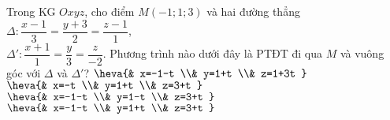 \begin{ex}%
Trong KG $Oxyz$, cho điểm $M(-1;1;3)$ và hai đường thẳng $\Delta \colon \dfrac{x-1}{3}=\dfrac{y+3}{2}=\dfrac{z-1}{1}$, \\
$\Delta' \colon \dfrac{x+1}{1}=\dfrac{y}{3}=\dfrac{z}{-2}$. Phương trình nào dưới đây là PTĐT đi qua $M$ và vuông góc với $\Delta$ và $\Delta'$?
\choice
{$\heva{& x=-1-t \\& y=1+t \\& z=1+3t }$}
{$\heva{& x=-t \\& y=1+t \\& z=3+t }$}
{$\heva{& x=-1-t \\& y=1-t \\& z=3+t }$}
{\True $\heva{& x=-1-t \\& y=1+t \\& z=3+t }$}
\end{ex}


